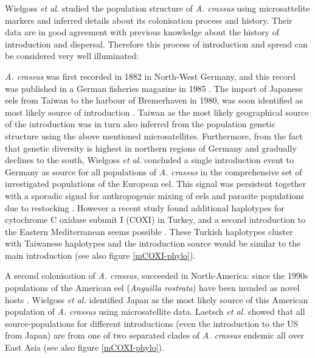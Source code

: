 Wielgoss \textit{et al.} \cite{wielgoss_population_2008} studied the
population structure of \textit{A. crassus} using microsattelite
markers and inferred details about its colonisation process and
history. Their data are in good agreement with previous knowledge
about the history of introduction and dispersal. Therefore this
process of introduction and spread can be considered very well
illuminated:


\textit{A. crassus} was first recorded in 1882 in North-West Germany,
and this record was published in a German fisheries magazine in 1985
\cite{fischer_teichwirt}. The import of Japanese eels from Taiwan to
the harbour of Bremerhaven in 1980, was soon identified as most likely
source of introduction
\cite{koops_anguillicola-infestations_1989}. Taiwan as the most likely
geographical source of the introduction was in turn also inferred from
the population genetic structure using the above mentioned
microsatellites. Furthermore, from the fact that genetic diversity is
highest in northern regions of Germany and gradually declines to the
south, Wielgoss \textit{et al.} \cite{wielgoss_population_2008}
concluded a single introduction event to Germany as source for all
populations of \textit{A. crassus} in the comprehensive set of
investigated populations of the European eel. This signal was
persistent together with a sporadic signal for anthropogenic mixing of
eels and parasite populations due to restocking
\cite{pmid20646147}. However a recent study found additional
haplotypes for cytochrome C oxidase subunit I (COXI) in Turkey, and a
second introduction to the Eastern Mediterranean seems possible
\cite{dl_py}. These Turkish haplotypes cluster with Taiwanese
haplotypes and the introduction source would be similar to the main
introduction (see also figure \ref{mCOXI-phylo}).

A second colonisation of \textit{A. crassus}, succeeded in
North-America: since the 1990s populations of the American eel
(\textit{Anguilla rostrata}) have been invaded as novel hosts
\cite{fries_notes:_1996,barse_exotic_1999,
  barse_swimbladder_2001}. Wielgoss \textit{et al.}
\cite{wielgoss_population_2008} identified Japan as the most likely
source of this American population of \textit{A. crassus} using
microsatellite data. Laetsch \textit{et al.}  \cite{dl_py} showed that
all source-populations for different introductions (even the
introduction to the US from Japan) are from one of two separated
clades of \textit{A. crassus} endemic all over East Asia (see also
figure \ref{mCOXI-phylo}).

